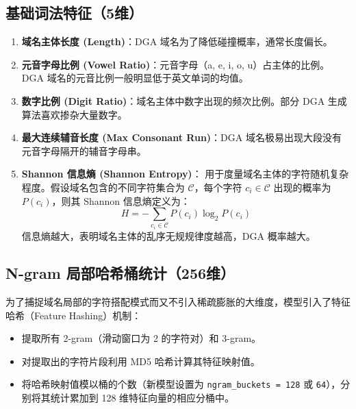 \documentclass[11pt,a4paper]{ctexart}
\begin{document}
\subsection{基础词法特征（5维）}
\begin{enumerate}
    \item \textbf{域名主体长度 (Length)}：DGA 域名为了降低碰撞概率，通常长度偏长。
    \item \textbf{元音字母比例 (Vowel Ratio)}：元音字母（a, e, i, o, u）占主体的比例。DGA 域名的元音比例一般明显低于英文单词的均值。
    \item \textbf{数字比例 (Digit Ratio)}：域名主体中数字出现的频次比例。部分 DGA 生成算法喜欢掺杂大量数字。
    \item \textbf{最大连续辅音长度 (Max Consonant Run)}：DGA 域名极易出现大段没有元音字母隔开的辅音字母串。
    \item \textbf{Shannon 信息熵 (Shannon Entropy)}：
    用于度量域名主体的字符随机复杂程度。假设域名包含的不同字符集合为 $\mathcal{C}$，每个字符 $c_i \in \mathcal{C}$ 出现的概率为 $P(c_i)$，则其 Shannon 信息熵定义为：
    \begin{equation}
        H = - \sum_{c_i \in \mathcal{C}} P(c_i) \log_2 P(c_i)
    \end{equation}
    信息熵越大，表明域名主体的乱序无规规律度越高，DGA 概率越大。
\end{enumerate}

\subsection{N-gram 局部哈希桶统计（256维）}
为了捕捉域名局部的字符搭配模式而又不引入稀疏膨胀的大维度，模型引入了特征哈希（Feature Hashing）机制：
\begin{itemize}
    \item 提取所有 2-gram（滑动窗口为 2 的字符对）和 3-gram。
    \item 对提取出的字符片段利用 MD5 哈希计算其特征映射值。
    \item 将哈希映射值模以桶的个数（新模型设置为 \texttt{ngram\_buckets = 128} 或 \texttt{64}），分别将其统计累加到 128 维特征向量的相应分桶中。
\end{itemize}
\end{document}
